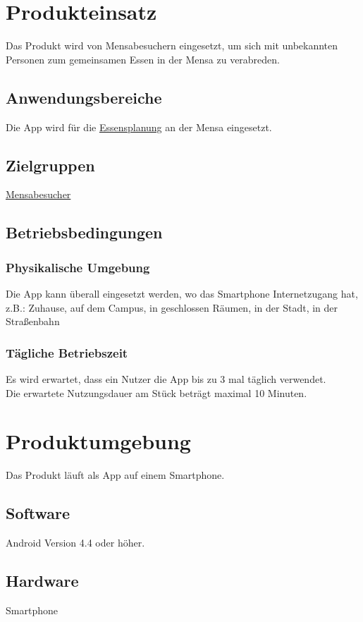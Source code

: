 \documentclass[a4paper]{scrreprt}
\begin{document}
\chapter{Produkteinsatz}
Das Produkt wird von Mensabesuchern eingesetzt, um sich mit unbekannten Personen zum gemeinsamen Essen in der Mensa zu verabreden.

 
\section{Anwendungsbereiche}
Die App wird für die \hyperlink{label3}{Essensplanung} an der Mensa eingesetzt.
 
\section{Zielgruppen}
\hyperlink{label1}{Mensabesucher}
 
\section{Betriebsbedingungen}
\subsection{Physikalische Umgebung}
Die App kann überall eingesetzt werden, wo das Smartphone Internetzugang hat,
z.B.: Zuhause, auf dem Campus, in geschlossen Räumen, in der Stadt, in der Straßenbahn

\subsection{Tägliche Betriebszeit}
Es wird erwartet, dass ein Nutzer die App bis zu 3 mal täglich verwendet. \\
Die erwartete Nutzungsdauer am Stück beträgt maximal 10 Minuten. 
 
\chapter{Produktumgebung}
Das Produkt läuft als App auf einem Smartphone.

\section{Software}
Android Version 4.4 oder höher.
 
\section{Hardware}
Smartphone 
 
\end{document}
